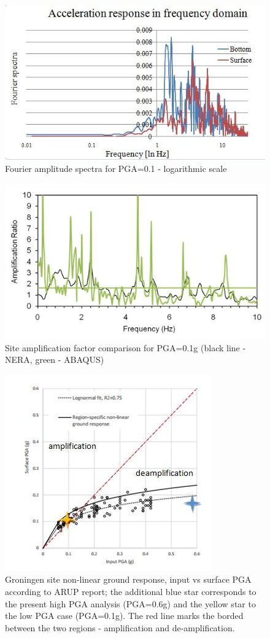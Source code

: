	\begin{figure}[!h]
		\centering
		\includegraphics[width=0.6\linewidth]{"spectral_low"}
		\caption{Fourier amplitude spectra for PGA=0.1 - logarithmic scale}
		\label{fourier3}
	\end{figure}
	
	\begin{figure}[!h]
		\centering
		\includegraphics[width=0.5\linewidth]{"site_ampl"}
		\caption{Site amplification factor comparison for PGA=0.1g (black line - NERA, green - ABAQUS)}
		\label{SAF}
	\end{figure}
	
	\begin{figure}[!h]
		\centering
		\includegraphics[width=0.5\linewidth]{"ARUP"}
		\caption{Groningen site non-linear ground response, input vs surface PGA according to ARUP report; the additional blue star corresponds to the present high PGA analysis (PGA=0.6g) and the yellow star to the low PGA case (PGA=0.1g). The red line marks the borded between the two regions - amplification and de-amplification.}
		\label{ARUP}
	\end{figure}
	
